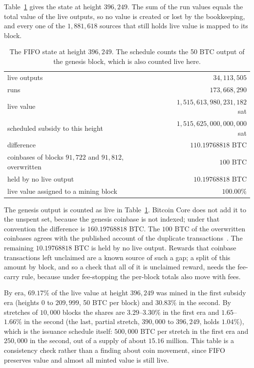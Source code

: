 \documentclass[11pt]{amsart}
\begin{document}
Table~\ref{tab:396} gives the state at height $396{,}249$. The sum of the run values equals the total value of the live outputs, so no value is created or lost by the bookkeeping, and every one of the $1{,}881{,}618$ sources that still holds live value is mapped to its block.

\begin{table}[tbp]
\centering
\begin{tabular}{lr}
\toprule
live outputs & $34{,}113{,}505$ \\
runs & $173{,}668{,}290$ \\
live value & $1{,}515{,}613{,}980{,}231{,}182$ sat \\
scheduled subsidy to this height & $1{,}515{,}625{,}000{,}000{,}000$ sat \\
difference & $110.19768818$ BTC \\
\quad coinbases of blocks $91{,}722$ and $91{,}812$, overwritten & $100$ BTC \\
\quad held by no live output & $10.19768818$ BTC \\
live value assigned to a mining block & $100.00\%$ \\
\bottomrule
\end{tabular}
\medskip
\caption{The FIFO state at height $396{,}249$. The schedule counts the 50 BTC output of the genesis block, which is also counted live here.}
\label{tab:396}
\end{table}

The genesis output is counted as live in Table~\ref{tab:396}. Bitcoin Core does not add it to the unspent set, because the genesis coinbase is not indexed; under that convention the difference is $160.19768818$ BTC. The $100$ BTC of the overwritten coinbases agrees with the published account of the duplicate transactions~\cite{BIP30}. The remaining $10.19768818$ BTC is held by no live output. Rewards that coinbase transactions left unclaimed are a known source of such a gap; a split of this amount by block, and so a check that all of it is unclaimed reward, needs the fee-carry rule, because under fee-stopping the per-block totals also move with fees.

By era, $69.17\%$ of the live value at height $396{,}249$ was mined in the first subsidy era (heights $0$ to $209{,}999$, 50 BTC per block) and $30.83\%$ in the second. By stretches of $10{,}000$ blocks the shares are $3.29$--$3.30\%$ in the first era and $1.65$--$1.66\%$ in the second (the last, partial stretch, $390{,}000$ to $396{,}249$, holds $1.04\%$), which is the issuance schedule itself: $500{,}000$ BTC per stretch in the first era and $250{,}000$ in the second, out of a supply of about $15.16$ million. This table is a consistency check rather than a finding about coin movement, since FIFO preserves value and almost all minted value is still live.
\end{document}
